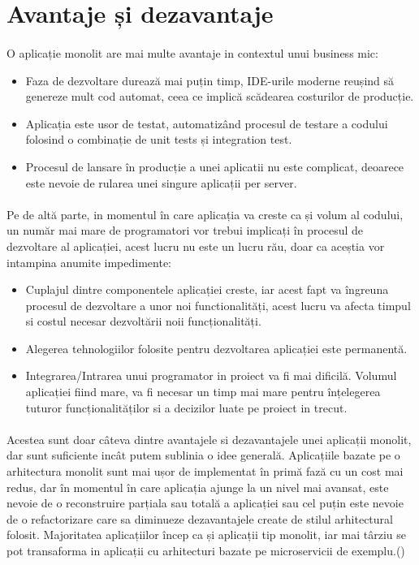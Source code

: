 \documentclass[12pt]{report}
\begin{document}
  	\section{Avantaje și dezavantaje}
  	\paragraph{}O aplicație monolit are mai multe avantaje in contextul unui business mic:  	
  	\begin{itemize}
  	\item Faza de dezvoltare durează mai puțin timp, IDE-urile moderne reușind să genereze mult cod automat, ceea ce implică scădearea costurilor de producție.
  	\item Aplicația este usor de testat, automatizând procesul de testare a codului folosind o combinație de unit tests și integration test. 
  	\item Procesul de lansare în producție a unei aplicatii nu este complicat, deoarece este nevoie de rularea unei singure aplicații per server.
  	\end{itemize}
  	\paragraph{}Pe de altă parte, in momentul în care aplicația va creste ca și volum al codului, un număr mai mare de programatori vor trebui implicați în procesul de dezvoltare al aplicației, acest lucru nu este un lucru rău, doar ca aceștia vor intampina anumite impedimente:
  	\begin{itemize}
  	\item Cuplajul dintre componentele aplicației creste, iar acest fapt va îngreuna procesul de dezvoltare a unor noi functionalități, acest lucru va afecta timpul si costul necesar dezvoltării noii funcționalități.  
	\item Alegerea tehnologiilor folosite pentru dezvoltarea aplicației este permanentă.
	\item Integrarea/Intrarea unui programator in proiect va fi mai dificilă. Volumul aplicației fiind mare, va fi necesar un timp mai mare pentru înțelegerea tuturor funcționalităților si a decizilor luate pe proiect in trecut.
  	\end{itemize}
  	\paragraph{}Acestea sunt doar câteva dintre avantajele si dezavantajele unei aplicații monolit, dar sunt suficiente incât putem sublinia o idee generală. Aplicațiile bazate pe o arhitectura monolit sunt mai ușor de implementat în primă fază cu un cost mai redus, dar în momentul în care aplicația ajunge la un nivel mai avansat, este nevoie de o reconstruire parțiala sau totală a aplicației sau cel puțin este nevoie de o refactorizare care sa diminueze dezavantajele create de stilul arhitectural folosit. Majoritatea aplicațiilor încep ca și aplicații tip monolit, iar mai târziu se pot transaforma in aplicații cu arhitecturi bazate pe microservicii de exemplu.(\cite{thones2015microservices})
\end{document}
